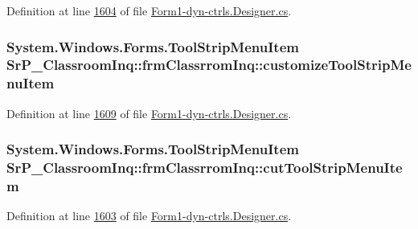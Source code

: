 \-Definition at line \hyperlink{_form1-dyn-ctrls_8_designer_8cs_source_l01604}{1604} of file \hyperlink{_form1-dyn-ctrls_8_designer_8cs_source}{\-Form1-\/dyn-\/ctrls.\-Designer.\-cs}.

\hypertarget{class_sr_p___classroom_inq_1_1frm_classrrom_inq_a3296cc0b41841b3014df5c5759d9e839}{
\subsubsection[{customize\-Tool\-Strip\-Menu\-Item}]{\setlength{\rightskip}{0pt plus 5cm}\-System.\-Windows.\-Forms.\-Tool\-Strip\-Menu\-Item {\bf \-Sr\-P\-\_\-\-Classroom\-Inq\-::frm\-Classrrom\-Inq\-::customize\-Tool\-Strip\-Menu\-Item}}}
\label{class_sr_p___classroom_inq_1_1frm_classrrom_inq_a3296cc0b41841b3014df5c5759d9e839}


\-Definition at line \hyperlink{_form1-dyn-ctrls_8_designer_8cs_source_l01609}{1609} of file \hyperlink{_form1-dyn-ctrls_8_designer_8cs_source}{\-Form1-\/dyn-\/ctrls.\-Designer.\-cs}.

\hypertarget{class_sr_p___classroom_inq_1_1frm_classrrom_inq_a62b714f774f74f0e4a36f60909cf7d78}{
\subsubsection[{cut\-Tool\-Strip\-Menu\-Item}]{\setlength{\rightskip}{0pt plus 5cm}\-System.\-Windows.\-Forms.\-Tool\-Strip\-Menu\-Item {\bf \-Sr\-P\-\_\-\-Classroom\-Inq\-::frm\-Classrrom\-Inq\-::cut\-Tool\-Strip\-Menu\-Item}}}
\label{class_sr_p___classroom_inq_1_1frm_classrrom_inq_a62b714f774f74f0e4a36f60909cf7d78}


\-Definition at line \hyperlink{_form1-dyn-ctrls_8_designer_8cs_source_l01603}{1603} of file \hyperlink{_form1-dyn-ctrls_8_designer_8cs_source}{\-Form1-\/dyn-\/ctrls.\-Designer.\-cs}.

